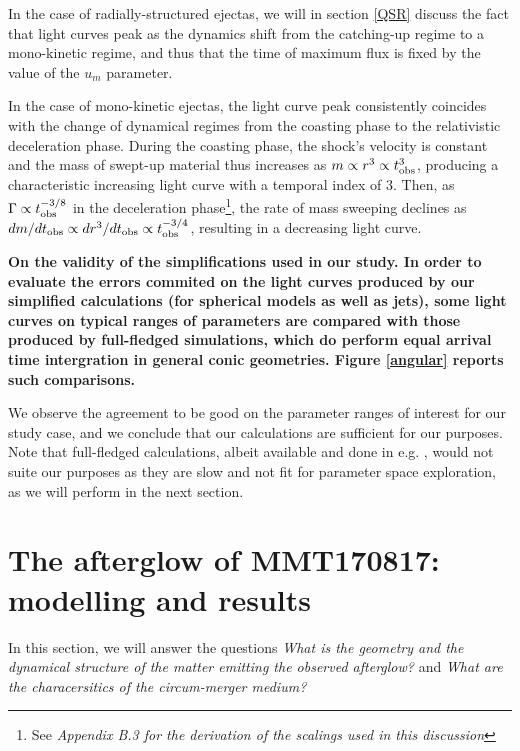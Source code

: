 In the case of radially-structured ejectas, we will in section \ref{QSR} discuss the fact that light curves peak as the dynamics shift from the catching-up regime to a mono-kinetic regime, and thus that the time of maximum flux is fixed by the value of the $u_m$ parameter.

In the case of mono-kinetic ejectas, the light curve peak consistently coincides with the change of dynamical regimes from the coasting phase to the relativistic deceleration phase. During the coasting phase, the shock's velocity is constant and the mass of swept-up material thus increases as $m \propto r^3 \propto t_{\mathrm{obs}}^3$, producing a characteristic increasing light curve with a temporal index of $3$. Then, as $\Gamma \propto t_{\mathrm{obs}}^{-3/8}$ in the deceleration phase\footnote{See \it{Appendix B.3} for the derivation of the scalings used in this discussion}, the rate of mass sweeping declines as $dm/dt_{\mathrm{obs}} \propto dr^3/dt_{\mathrm{obs}} \propto  t_{\mathrm{obs}}^{-3/4}$, resulting in a decreasing light curve.

\bf{On the validity of the simplifications used in our study.} In order to evaluate the errors commited on the light curves produced by our simplified calculations (for spherical models as well as jets), some light curves on typical ranges of parameters are compared with those produced by full-fledged simulations, which do perform equal arrival time intergration in general conic geometries. Figure \ref{angular} reports such comparisons.


We observe the agreement to be good on the parameter ranges of interest for our study case, and we conclude that our calculations are sufficient for our purposes. Note that full-fledged calculations, albeit available and done in e.g. \citep{45}, would not suite our purposes as they are slow and not fit for parameter space exploration, as we will perform in the next section.

\section{The afterglow of MMT170817: modelling and results}

In this section, we will answer the questions \textit{What is the geometry and the dynamical structure of the matter emitting the observed afterglow?} and \textit{What are the characersitics of the circum-merger medium?}

